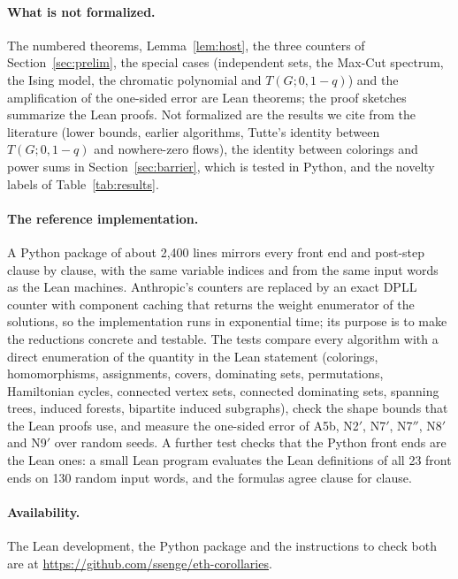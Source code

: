 \documentclass[11pt]{article}
\theoremstyle{remark}
\begin{document}
\paragraph{What is not formalized.} The numbered theorems, Lemma~\ref{lem:host}, the three
counters of Section~\ref{sec:prelim}, the special cases (independent sets, the Max-Cut spectrum, the
Ising model, the chromatic polynomial and $T(G;0,1-q)$) and the amplification of the one-sided error
are Lean theorems; the proof sketches summarize the Lean proofs. Not formalized are the results we
cite from the literature (lower bounds, earlier algorithms, Tutte's identity between $T(G;0,1-q)$ and
nowhere-zero flows), the identity between colorings and power sums in Section~\ref{sec:barrier},
which is tested in Python, and the novelty labels of Table~\ref{tab:results}.

\paragraph{The reference implementation.} A Python package of about 2{,}400 lines mirrors every
front end and post-step clause by clause, with the same variable indices and from the same input
words as the Lean machines. Anthropic's counters are replaced by an exact DPLL counter with
component caching that returns the weight enumerator of the solutions, so the implementation runs
in exponential time; its purpose is to make the reductions concrete and testable. The tests
compare every algorithm with a direct enumeration of the quantity in the Lean statement (colorings,
homomorphisms, assignments, covers, dominating sets, permutations, Hamiltonian cycles, connected
vertex sets, connected dominating sets, spanning trees, induced forests, bipartite induced subgraphs), check the shape bounds that the Lean proofs
use, and measure the one-sided error of A5b, N2$'$, N7$'$, N7$''$, N8$'$ and N9$'$ over random seeds. A further test checks that the Python front ends are the Lean ones:
a small Lean program evaluates the Lean definitions of all 23 front ends on 130 random input words,
and the formulas agree clause for clause.

\paragraph{Availability.} The Lean development, the Python package and the instructions to check
both are at \url{https://github.com/ssenge/eth-corollaries}.

\end{document}
